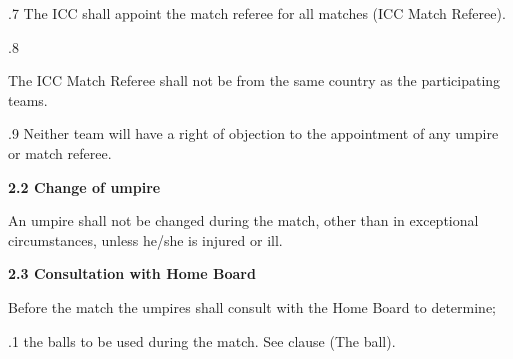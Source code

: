 \documentclass[12pt]{article}
\begin{document}
\vspace{\baselineskip}
{\fontsize{9pt}{10.8pt}.7 \tabto{0.49in} The ICC shall appoint the match referee for all matches (ICC Match Referee).\par}\par


\vspace{\baselineskip}
{\fontsize{9pt}{10.8pt}.8 \tabto{0.49in} {\fontsize{8pt}{9.6pt}\selectfont The ICC Match Referee shall not be from the same country as the participating teams.\par}\par}\par


\vspace{\baselineskip}
{\fontsize{9pt}{10.8pt}.9 \tabto{0.49in} Neither team will have a right of objection to the appointment of any umpire or match referee.\par}\par


\vspace{\baselineskip}
{\fontsize{11pt}{13.2pt}\selectfont \textbf{2.2 \tabto{0.47in} Change of umpire}\par}\par


\vspace{\baselineskip}
\begin{adjustwidth}{0.0in}{0.14in}
{\fontsize{9pt}{10.8pt}\selectfont An umpire shall not be changed during the match, other than in exceptional circumstances, unless he/she is injured or ill.\par}\par

\end{adjustwidth}


\vspace{\baselineskip}
{\fontsize{11pt}{13.2pt}\selectfont \textbf{2.3 \tabto{0.47in} Consultation with Home Board}\par}\par


\vspace{\baselineskip}
{\fontsize{9pt}{10.8pt}\selectfont Before the match the umpires shall consult with the Home Board to determine;\par}\par


\vspace{\baselineskip}
{\fontsize{9pt}{10.8pt}.1 \tabto{0.49in} the balls to be used during the match. See clause (The ball).\par}\par
\end{document}
